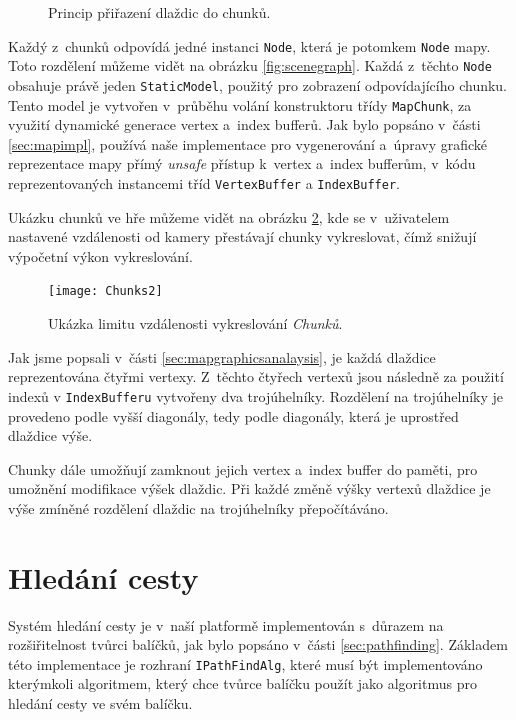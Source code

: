 \begin{figure}[h]
	\centering
	\fontsize{10pt}{12pt}\selectfont
	\def\svgwidth{0.7\textwidth}
	
	\caption{Princip přiřazení dlaždic do chunků.}
	\label{fig:mapdisplay}
\end{figure}

Každý z~chunků odpovídá jedné instanci \texttt{Node}, která je potomkem \texttt{Node} mapy. Toto rozdělení můžeme vidět na obrázku \ref{fig:scenegraph}. Každá z~těchto \texttt{Node} obsahuje právě jeden \texttt{StaticModel}, použitý pro zobrazení odpovídajícího chunku. Tento model je vytvořen v~průběhu volání konstruktoru třídy \texttt{MapChunk}, za využití dynamické generace vertex a~index bufferů. Jak bylo popsáno v~části \ref{sec:mapimpl}, používá naše implementace pro vygenerování a~úpravy grafické reprezentace mapy přímý \textit{unsafe} přístup k~vertex a~index bufferům, v~kódu reprezentovaných instancemi tříd \texttt{VertexBuffer} a \texttt{IndexBuffer}.


Ukázku chunků ve hře můžeme vidět na obrázku \ref{fig:chunks}, kde se v~uživatelem nastavené vzdálenosti od kamery přestávají chunky vykreslovat, čímž snižují výpočetní výkon vykreslování.

\begin{figure}[h]
	\centering
	\texttt{[image: Chunks2]}
	\caption{Ukázka limitu vzdálenosti vykreslování \textit{Chunků}.}
	\label{fig:chunks}
\end{figure}

Jak jsme popsali v~části \ref{sec:mapgraphicsanalaysis}, je každá dlaždice reprezentována čtyřmi vertexy. Z~těchto čtyřech vertexů jsou následně za použití indexů v \texttt{IndexBufferu} vytvořeny dva trojúhelníky. Rozdělení na trojúhelníky je provedeno podle vyšší diagonály, tedy podle diagonály, která je uprostřed dlaždice výše. 

Chunky dále umožňují zamknout jejich vertex a~index buffer do paměti, pro umožnění modifikace výšek dlaždic. Při každé změně výšky vertexů dlaždice je výše zmíněné rozdělení dlaždic na trojúhelníky přepočítáváno.

\section{Hledání cesty}
\label{sec:pathfindingdocu}
Systém hledání cesty je v~naší platformě implementován s~důrazem na rozšiřitelnost tvůrci balíčků, jak bylo popsáno v~části \ref{sec:pathfinding}. Základem této implementace je rozhraní \texttt{IPathFindAlg}, které musí být implementováno kterýmkoli algoritmem, který chce tvůrce balíčku použít jako algoritmus pro hledání cesty ve svém balíčku.

